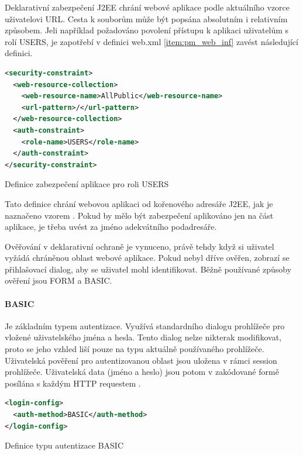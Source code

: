 \documentclass[thesis=M,czech]{FITthesis}[2012/06/26]
\begin{document}
Deklarativní zabezpečení J2EE chrání webové aplikace podle aktuálního vzorce uživatelovi URL. Cesta k souborům může být popsána absolutním i relativním způsobem. Jeli například požadováno povolení přístupu k aplikaci uživatelům s rolí USERS, je zapotřebí v definici web.xml \ref{item:pm_web_inf} zavést následující definici.

\begin{algorithm}[H]	
	\begin{lstlisting}[language = XML]  
<security-constraint> 
  <web-resource-collection> 
    <web-resource-name>AllPublic</web-resource-name> 
    <url-pattern>/</url-pattern> 
  </web-resource-collection> 
  <auth-constraint> 
    <role-name>USERS</role-name> 
  </auth-constraint> 
</security-constraint>
	\end{lstlisting}
	\caption{Definice zabezpečení aplikace pro roli USERS}	
	\label{code:j2ee_definition}
	\small Tato definice chrání webovou aplikaci od kořenového adresáře J2EE, jak je naznačeno vzorem \uv{\textbackslash}. Pokud by mělo být zabezpečení aplikováno jen na část aplikace, je třeba uvést za \uv{\textbackslash} jméno adekvátního podadresáře.
\end{algorithm}	

Ověřování v deklarativní ochraně je vynuceno, právě tehdy když si uživatel vyžádá chráněnou oblast webové aplikace. Pokud nebyl dříve ověřen, zobrazí se přihlašovací dialog, aby se uživatel mohl identifikovat. Běžně používané způsoby ověření jsou FORM a BASIC. 

\paragraph{BASIC} Je základním typem autentizace. Využívá standardního dialogu prohlížeče pro vložené uživatelského jména a hesla. Tento dialog nelze nikterak modifikovat, proto se jeho vzhled liší pouze na typu aktuálně používaného prohlížeče. Uživatelská pověření pro autentizovanou oblast jsou uložena v rámci session prohlížeče. Uživatelská data (jméno a heslo) jsou potom v zakódované formě posílána s každým HTTP requestem \cite{basic_form}.

\begin{algorithm}[H]	
	\begin{lstlisting}[language = XML]  
<login-config> 
  <auth-method>BASIC</auth-method> 
</login-config>
	\end{lstlisting}
	\caption{Definice typu autentizace BASIC}	
	\label{code:auth_basic_def}
\end{algorithm}	
\end{document}

